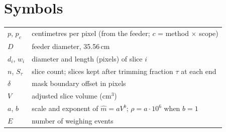 \documentclass[11pt,a4paper]{article}
\begin{document}
\section{Symbols}
\begin{tabular}{@{}ll@{}}
\toprule
$p$, $p_c$ & centimetres per pixel (from the feeder; $c$ = method $\times$ scope)\\
$D$ & feeder diameter, 35.56\,cm\\
$d_i$, $w_i$ & diameter and length (pixels) of slice $i$\\
$n$, $S_\tau$ & slice count; slices kept after trimming fraction $\tau$ at each end\\
$\delta$ & mask boundary offset in pixels\\
$V$ & adjusted slice volume (cm$^3$)\\
$a$, $b$ & scale and exponent of $\hat m=aV^b$; $\rho=a\cdot10^6$ when $b=1$\\
$E$ & number of weighing events\\
\bottomrule
\end{tabular}
\end{document}
